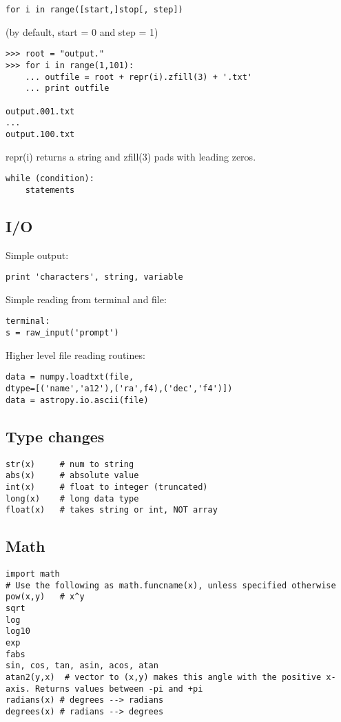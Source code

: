 \documentclass{article}
\begin{document}
\begin{multicols}{2}
\begin{lstlisting}
for i in range([start,]stop[, step])
\end{lstlisting}
(by default, start = 0 and step = 1)
\begin{lstlisting}
>>> root = "output."
>>> for i in range(1,101):
    ... outfile = root + repr(i).zfill(3) + '.txt'
    ... print outfile

output.001.txt
...
output.100.txt
\end{lstlisting}
repr(i) returns a string and zfill(3) pads with leading zeros.
\begin{lstlisting}
while (condition):
    statements
\end{lstlisting}

\subsection{I/O}
Simple output:
\begin{lstlisting}
print 'characters', string, variable
\end{lstlisting}

Simple reading from terminal and file:
\begin{lstlisting}
terminal:
s = raw_input('prompt')
\end{lstlisting}

Higher level file reading routines:
\begin{lstlisting}
data = numpy.loadtxt(file,
dtype=[('name','a12'),('ra',f4),('dec','f4')])
data = astropy.io.ascii(file)
\end{lstlisting}

\subsection{Type changes}
\begin{lstlisting}
str(x)     # num to string
abs(x)     # absolute value
int(x)     # float to integer (truncated)
long(x)    # long data type
float(x)   # takes string or int, NOT array
\end{lstlisting}
\vfill
\columnbreak

\subsection{Math}
\begin{lstlisting}
import math
# Use the following as math.funcname(x), unless specified otherwise
pow(x,y)   # x^y
sqrt
log
log10
exp
fabs
sin, cos, tan, asin, acos, atan
atan2(y,x)  # vector to (x,y) makes this angle with the positive x-axis. Returns values between -pi and +pi
radians(x) # degrees --> radians
degrees(x) # radians --> degrees


\end{lstlisting}
\end{multicols}
\end{document}
